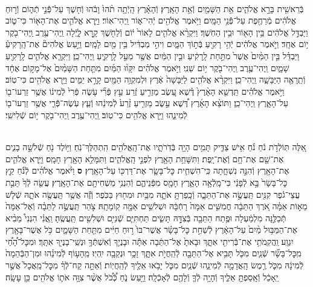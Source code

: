 \documentclass[twoside, openany, parskip=half, 11pt]{book}
\begin{document}
\begin{footnotesize}

\begin{multicols}{2}
\\
בְּֿרֵאשִׁ֖ית בָּרָ֣א אֱלֹהִ֑ים אֵ֥ת הַשָּׁמַ֖יִם וְֿאֵ֥ת הָאָֽרֶץ׃ וְֿהָאָ֗רֶץ הָֽיְֿתָ֥ה תֹ֨הוּ֙ וָבֹ֔הוּ וְֿח֖שֶׁךְ עַל־פְּֿֿנֵ֣י תְֿה֑וֹם וְֿר֣וּחַ אֱלֹהִ֔ים מְֿרַחֶ֖פֶת עַל־פְּֿֿנֵ֥י הַמָּֽיִם׃ וַיֹּ֥אמֶר אֱלֹהִ֖ים יְֿהִי־א֑וֹר וַֽיְהִי־אֽוֹר׃ וַיַּ֧רְא אֱלֹהִ֛ים אֶת־הָא֖וֹר כִּי־ט֑וֹב וַיַּבְדֵּ֣ל אֱלֹהִ֔ים בֵּ֥ין הָא֖וֹר וּבֵ֥ין הַחֹֽשֶׁךְ׃ וַיִּקְרָ֨א אֱלֹהִ֤ים לָאוֹר֙ י֔וֹם וְֿלַחֹ֖שֶׁךְ קָ֣רָא לָ֑יְֿלָה וַֽיְהִי־עֶ֥רֶב וַֽיְהִי־בֹ֖קֶר י֥וֹם אֶחָֽד׃
 וַיֹּ֣אמֶר אֱלֹהִ֔ים יְֿהִ֥י רָקִ֖יעַ בְּֿת֣וֹךְ הַמָּ֑יִם וִיהִ֣י מַבְדִּ֔יל בֵּ֥ין מַ֖יִם לָמָֽיִם׃ וַיַּ֣עַשׂ אֱלֹהִים֘ אֶת־הָֽרָקִיעַ֒ וַיַּבְדֵּ֗ל בֵּ֤ין הַמַּ֨יִם֙ אֲשֶׁר֙ מִתַּ֣חַת לָֽרָקִ֔יעַ וּבֵ֣ין הַמַּ֔יִם אֲשֶׁ֖ר מֵעַ֣ל לָֽרָקִ֑יעַ וַֽיְהִי־כֵֽן׃ וַיִּקְרָ֧א אֱלֹהִ֛ים לָֽרָקִ֖יעַ שָׁמָ֑יִם וַֽיְהִי־עֶ֥רֶב וַֽיְהִי־בֹ֖קֶר י֥וֹם שֵׁנִֽי׃
וַיֹּ֣אמֶר אֱלֹהִ֗ים יִקָּו֨וּ הַמַּ֜יִם מִתַּ֤חַת הַשָּׁמַ֨יִם֙ אֶל־מָק֣וֹם אֶחָ֔ד וְֿתֵֽרָאֶ֖ה הַיַּבָּשָׁ֑ה וַֽיְהִי־כֵֽן׃ וַיִּקְרָ֨א אֱלֹהִ֤ים לַיַּבָּשָׁה֙ אֶ֔רֶץ וּלְמִקְוֵ֥ה הַמַּ֖יִם קָרָ֣א יַמִּ֑ים וַיַּ֥רְא אֱלֹהִ֖ים כִּי־טֽוֹב׃ וַיֹּ֣אמֶר אֱלֹהִ֗ים תַּֽדְשֵׁ֤א הָאָ֨רֶץ֙ דֶּ֗שֶׁא עֵ֚שֶׂב מַזְרִ֣יעַ זֶ֔רַע עֵ֣ץ פְּֿרִ֞י עֹ֤שֶׂה פְּֿרִי֙ לְֿמִינ֔וֹ אֲשֶׁ֥ר זַרְעוֹ־ב֖וֹ עַל־הָאָ֑רֶץ וַֽיְהִי־כֵֽן׃ וַתּוֹצֵ֨א הָאָ֜רֶץ דֶּ֠שֶׁא עֵ֣שֶׂב מַזְרִ֤יעַ זֶ֨רַע֙ לְֿמִינֵ֔הוּ וְֿעֵ֧ץ עֹֽשֶׂה־פְּֿֿרִ֛י אֲשֶׁ֥ר זַרְעוֹ־ב֖וֹ לְֿמִינֵ֑הוּ וַיַּ֥רְא אֱלֹהִ֖ים כִּי־טֽוֹב׃ וַֽיְהִי־עֶ֥רֶב וַֽיְהִי־בֹ֖קֶר י֥וֹם שְֿׁלִישִֽׁי׃

\\
אֵ֚לֶּה תּֽוֹלְֿדֹ֣ת נֹ֔חַ נֹ֗חַ אִ֥ישׁ צַדִּ֛יק תָּמִ֥ים הָיָ֖ה בְּֿדֹֽרֹתָ֑יו אֶת־הָֽאֱלֹהִ֖ים הִֽתְהַלֶּךְ־נֹֽחַ׃ וַיּ֥וֹלֶד נֹ֖חַ שְֿׁלֹשָׁ֣ה בָנִ֑ים אֶת־שֵׁ֖ם אֶת־חָ֥ם וְֿאֶת־יָֽפֶת׃ וַתִּשָּׁחֵ֥ת הָאָ֖רֶץ לִפְנֵ֣י הָֽאֱלֹהִ֑ים וַתִּמָּלֵ֥א הָאָ֖רֶץ חָמָֽס׃ וַיַּ֧רְא אֱלֹהִ֛ים אֶת־הָאָ֖רֶץ וְֿהִנֵּ֣ה נִשְׁחָ֑תָה כִּֽי־הִשְׁחִ֧ית כׇּל־בָּשָׂ֛ר אֶת־דַּרְכּ֖וֹ עַל־הָאָֽרֶץ׃ \textbf{ס} וַיֹּ֨אמֶר אֱלֹהִ֜ים לְֿנֹ֗חַ קֵ֤ץ כׇּל־בָּשָׂר֙ בָּ֣א לְֿפָנַ֔י כִּי־מָֽלְֿאָ֥ה הָאָ֛רֶץ חָמָ֖ס מִפְּֿנֵיהֶ֑ם וְֿהִנְנִ֥י מַשְׁחִיתָ֖ם אֶת־הָאָֽרֶץ׃ עֲשֵׂ֤ה לְֿךָ֙ תֵּבַ֣ת עֲצֵי־גֹ֔פֶר קִנִּ֖ים תַּֽעֲשֶׂ֣ה אֶת־הַתֵּבָ֑ה וְֿכָֽפַרְתָּ֥ אֹתָ֛הּ מִבַּ֥יִת וּמִח֖וּץ בַּכֹּֽפֶר׃ וְֿזֶ֕ה אֲשֶׁ֥ר תַּֽעֲשֶׂ֖ה אֹתָ֑הּ שְֿׁל֧שׁ מֵא֣וֹת אַמָּ֗ה אֹ֚רֶךְ הַתֵּבָ֔ה חֲמִשִּׁ֤ים אַמָּה֙ רָחְֿבָּ֔הּ וּשְׁלשִׁ֥ים אַמָּ֖ה קֽוֹמָתָֽהּ׃ צֹ֣הַר תַּֽעֲשֶׂ֣ה לַתֵּבָ֗ה וְֿאֶל־אַמָּה֙ תְּֿכַלֶּ֣נָּה מִלְמַ֔עְלָה וּפֶ֥תַח הַתֵּבָ֖ה בְּֿצִדָּ֣הּ תָּשִׂ֑ים תַּחְתִּיִּ֛ם שְֿׁנִיִּ֥ם וּשְׁלִשִׁ֖ים תַּֽעֲשֶֽׂהָ׃  וַֽאֲנִ֗י הִנְנִי֩ מֵבִ֨יא אֶת־הַמַּבּ֥וּל מַ֨יִם֙ עַל־הָאָ֔רֶץ לְֿשַׁחֵ֣ת כׇּל־בָּשָׂ֗ר אֲשֶׁר־בּוֹ֙ ר֣וּחַ חַיִּ֔ים מִתַּ֖חַת הַשָּׁמָ֑יִם כֹּ֥ל אֲשֶׁר־בָּאָ֖רֶץ יִגְוָֽע׃ וַֽהֲקִֽמֹתִ֥י אֶת־בְּֿֿרִיתִ֖י אִתָּ֑ךְ וּבָאתָ֙ אֶל־הַתֵּ֔בָה אַתָּ֕ה וּבָנֶי֛ךָ וְֿאִשְׁתְּֿךָ֥ וּנְשֵֽׁי־בָנֶי֖ךָ אִתָּֽךְ׃ וּמִכׇּל־הָ֠חַ֠י מִֽכׇּל־בָּשָׂ֞ר שְֿׁנַ֧יִם מִכֹּ֛ל תָּבִ֥יא אֶל־הַתֵּבָ֖ה לְֿהַֽחֲיֹ֣ת אִתָּ֑ךְ זָכָ֥ר וּנְקֵבָ֖ה יִֽהְיֽוּ׃  מֵֽהָע֣וֹף לְֿמִינֵ֗הוּ וּמִן־הַבְּֿהֵמָה֙ לְֿמִינָ֔הּ מִכֹּ֛ל רֶ֥מֶשׂ הָֽאֲדָמָ֖ה לְֿמִינֵ֑הוּ שְֿׁנַ֧יִם מִכֹּ֛ל יָבֹ֥אוּ אֵלֶ֖יךָ לְֿהַֽחֲיֽוֹת׃ וְֿאַתָּ֣ה קַח־לְֿךָ֗ מִכׇּל־מַֽאֲכָל֙ אֲשֶׁ֣ר יֵֽאָכֵ֔ל וְֿאָֽסַפְתָּ֖ אֵלֶ֑יךָ וְֿהָיָ֥ה לְֿךָ֛ וְֿלָהֶ֖ם לְֿאָכְֿלָֽה׃ וַיַּ֖עַשׂ נֹ֑חַ כְּֿ֠כֹ֠ל אֲשֶׁ֨ר צִוָּ֥ה אֹת֛וֹ אֱלֹהִ֖ים כֵּ֥ן עָשָֽׂה׃


\end{multicols}
\end{footnotesize}
\end{document}

